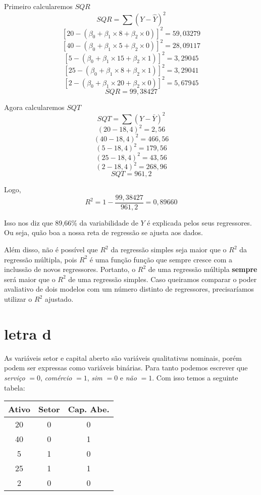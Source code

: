 Primeiro calcularemos \(SQR\)
\[SQR = \sum (Y - \widehat{Y})^{2}\]
\[ [ 20 - (\beta_{0} + \beta_{1} \times 8 + \beta_{2} \times 0)]^{2} =  59,03279 \]
\[ [ 40 - (\beta_{0} + \beta_{1} \times 5 + \beta_{2} \times 0)]^{2} =  28,09117 \]
\[ [ 5 - (\beta_{0} + \beta_{1} \times 15 + \beta_{2} \times 1)]^{2} =  3,29045 \]
\[ [ 25 - (\beta_{0} + \beta_{1} \times 8 + \beta_{2} \times 1)]^{2} =  3,29041 \]
\[ [ 2 - (\beta_{0} + \beta_{1} \times 20 + \beta_{2} \times 0)]^{2} =  5,67945 \]
\[ SQR = 99,38427\]

Agora calcularemos \(SQT\)
\[SQT = \sum (Y-\bar{Y})^{2}\]
\[ ( 20 - 18,4)^{2} = 2,56 \]
\[ ( 40 - 18,4)^{2} = 466,56 \]
\[ ( 5 - 18,4)^{2} = 179,56 \]
\[ ( 25 - 18,4)^{2} = 43,56 \]
\[ ( 2 - 18,4)^{2} = 268,96 \]
\[ SQT = 961,2\]

Logo,
\[ R^{2} = 1 - \frac{99,38427}{961,2} = 0,89660\]

Isso nos diz que 89,66\% da variabilidade de \(Y\) é explicada pelos seus regressores. Ou seja, quão boa a nossa reta de regressão se ajusta aos dados.

Além disso, não é possível que \(R^{2}\) da regressão simples seja maior que o \(R^{2}\) da regressão múltipla, pois \(R^{2}\) é uma função função que sempre cresce com a inclussão de novos regressores. Portanto, o \(R^{2}\) de uma regressão múltipla \textbf{sempre} será maior que o \(R^{2}\) de uma regressão simples. Caso queiramos comparar o poder avaliativo de dois modelos com um número distinto de regressores, precisaríamos utilizar o \(R^{2}\) ajustado.

\section*{letra d}
As variáveis setor e capital aberto são variáveis qualitativas nominais, porém podem ser expressas como variáveis binárias. Para tanto podemos escrever que \textit{serviço} \(= 0\), \textit{comércio} \(= 1\), \textit{sim} \(= 0\) e \textit{não} \(= 1\). Com isso temos a seguinte tabela:
\begin{center}
    \begin{tabular}{|c|c|c|}
        \hline
         Ativo & Setor & Cap. Abe. \\ \hline
         20 & 0 & 0 \\ \hline
         40 & 0 & 1 \\ \hline
         5 & 1 & 0 \\ \hline
         25 & 1 & 1 \\ \hline
         2 & 0 & 0 \\ \hline
    \end{tabular}
\end{center}

